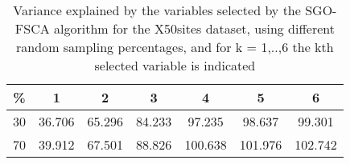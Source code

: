 \begin{table}
	\begin{center}
		\begin{tabular}{c c c c c c c}
			\% & 1 & 2 & 3 & 4 & 5 & 6 \\
			\hline
			30 & 36.706 & 65.296 & 84.233 & 97.235 & 98.637 & 99.301 \\
			70 & 39.912 & 67.501 & 88.826 & 100.638 & 101.976 & 102.742 \\
		\end{tabular}
	\end{center}
	\caption{Variance explained by the variables selected by the SGO-FSCA algorithm for the X50sites dataset, using different random sampling percentages, and for k = 1,..,6 the kth selected variable is indicated}
\end{table}